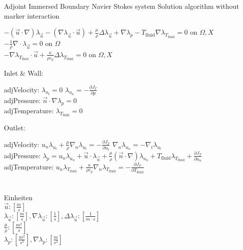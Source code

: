 \documentclass[10pt]{article} %
\begin{document}
\begin{center}
\begin{flushleft}
	Adjoint Immersed Boundary Navier Stokes system Solution algorithm without marker interaction
\end{flushleft}
	$-(\vec{u}\cdot\nabla) \lambda_{\vec{u}} - \left(\nabla \lambda_{\vec{u}} \cdot \vec{u}\right) + \frac{\mu}{\rho} \Delta \lambda_{\vec{u}} + \nabla\lambda_p - T_{\text{fluid}} \nabla \lambda_{T_{\text{fluid}}} = 0$ \quad on $\Omega,X$\\
	$-\frac{1}{\rho} \nabla \cdot \lambda_{\vec{u}} = 0$ \quad on $\Omega$\\
	$-\nabla \lambda_{T_{\text{fluid}}} \cdot \vec{u} + \frac{\kappa}{\rho c_p} \Delta  \lambda_{T_{\text{fluid}}} = 0$ \quad on $\Omega,X$\\
\begin{flushleft}
	Inlet \& Wall:
\end{flushleft}
	adjVelocity: $\lambda_{u_t} = 0$ \quad $\lambda_{u_n} = -\frac{\partial J_{\Gamma}}{\partial p}$\\
	adjPressure: $\vec{n} \cdot \nabla \lambda_p = 0$\\
	adjTemperature: $\lambda_{T_{\text{fluid}}} = 0$
\begin{flushleft}
	Outlet:
\end{flushleft}
	adjVelocity: $u_n \lambda_{u_t} + \frac{\mu}{\rho} \nabla_n\lambda_{u_t} = - \frac{\partial J_{\Gamma}}{\partial u_t}$ \quad $\nabla_n \lambda_{u_n} = - \nabla_t \lambda_{u_t}$\\
	adjPressure: $\lambda_p = u_n \lambda_{u_n} + \vec{u} \cdot \lambda_{\vec{u}} + \frac{\mu}{\rho} \left(\vec{n}\cdot \nabla\right)\lambda_{u_n} + T_{\text{fluid}} \lambda_{T_{\text{fluid}}} + \frac{\partial J_{\Gamma}}{\partial u_n}$ \\ 
	adjTemperature: $ u_n \lambda_{T_{\text{fluid}}} + \frac{\kappa}{\rho c_p} \nabla_n  \lambda_{T_{\text{fluid}}} = - \frac{\partial J_{\Gamma}}{\partial T_{\text{fluid}}}$\\
	\quad\\
	\quad\\
	Einheiten\\
	$\vec{u}: \left[ \frac{m}{s} \right]$\\
	$\lambda_{\vec{u}}: \left[ \frac{m}{s} \right], \nabla \lambda_{\vec{u}}: \left[ \frac{1}{s} \right], \Delta \lambda_{\vec{u}}: \left[ \frac{1}{m \cdot s} \right]$\\
	$\frac{\mu}{\rho}: \left[ \frac{m^2}{s} \right]$\\
	$\lambda_{p}: \left[ \frac{m^2}{s^2} \right], \nabla \lambda_{p}: \left[ \frac{m}{s^2} \right]$\\

\end{center}
\end{document}
